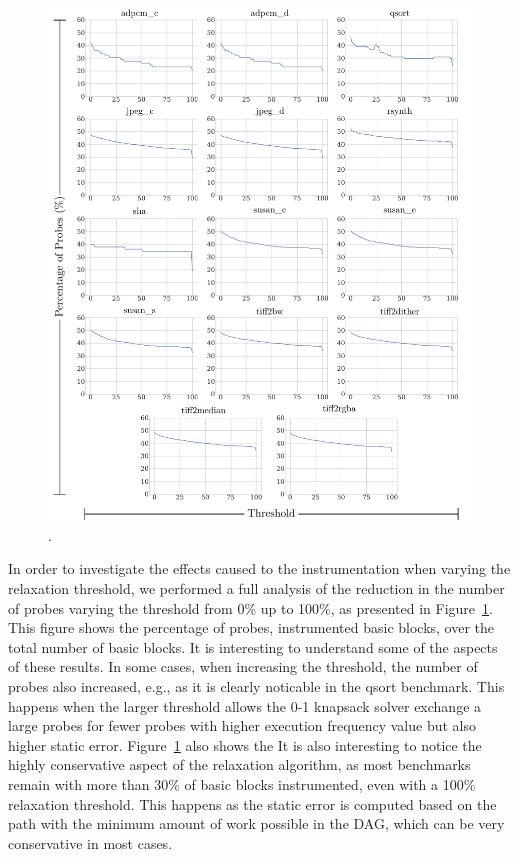 \begin{figure}[h!]
    \centering
    \includegraphics[width=\textwidth]{figs/instr-all-thresholds.pdf}
    \caption{.}
    \label{fig:instr-all-thresholds}
\end{figure}

In order to investigate the effects caused to the instrumentation when varying the relaxation threshold, we performed a full analysis of the reduction in the number of probes varying the threshold from 0\% up to 100\%, as presented in Figure~\ref{fig:instr-all-thresholds}.
This figure shows the percentage of probes, instrumented basic blocks, over the total number of basic blocks.
It is interesting to understand some of the aspects of these results.
In some cases, when increasing the threshold, the number of probes also increased, e.g., as it is clearly noticable in the {\flagstype qsort} benchmark.
This happens when the larger threshold allows the 0-1 knapsack solver exchange a large probes for fewer probes with higher execution frequency value but also higher static error.
Figure~\ref{fig:instr-all-thresholds} also shows the 
It is also interesting to notice the highly conservative aspect of the relaxation algorithm, as most benchmarks remain with more than 30\% of basic blocks instrumented, even with a 100\% relaxation threshold.
This happens as the static error is computed based on the path with the minimum amount of work possible in the DAG, which can be very conservative in most cases.

